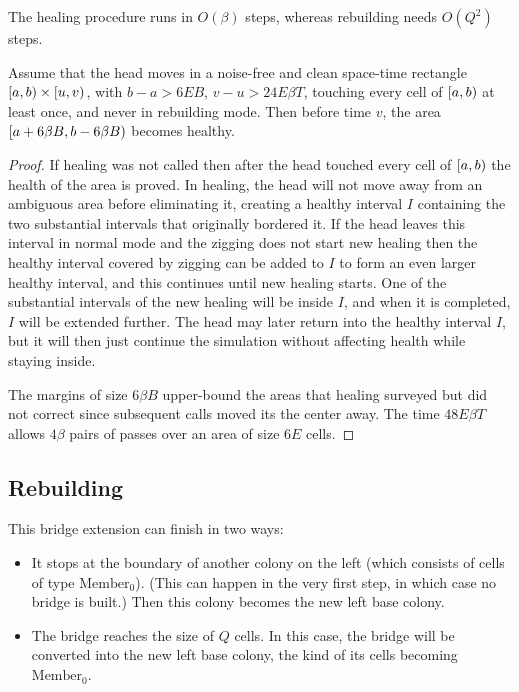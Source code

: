 \documentclass[11pt]{memoir}
\theoremstyle{definition} %
\def\B{B}
\newcommand{\E}{E} %
\newcommand{\Q}{Q} %
\newcommand{\Tu}{T}
\newcommand{\Member}{\mathrm{Member}}
\begin{document}
The healing procedure runs in \( O(\beta) \) 
steps, whereas rebuilding needs \( O(\Q^{2}) \) steps.

\begin{lemma}\label{lem:combined-heals}
  Assume that the head moves in a noise-free and clean space-time rectangle
  \( \left[a,b\right)\times \left[u,v\right) \), with \( b-a>6\E\B \), \( v-u>24\E\beta\Tu \),
touching every cell of \( \left[a,b\right) \) at least once, and never in rebuilding mode.
Then before time \( v \), the area \( \lint{a+6\beta\B}{b-6\beta\B} \) becomes healthy.
\end{lemma}
\begin{proof}
  If healing was not called then after the head touched every cell of \( \left[a,b\right) \) the
  health of the area is proved.
  In healing, the head will not move away from an ambiguous area before eliminating it,
  creating a healthy interval
  \( I \) containing the two substantial intervals that originally bordered it.
  If the head leaves this interval in normal mode and the zigging does not start new healing then the
  healthy interval covered by zigging can be added to \( I \) to form an even larger healthy interval,
  and this continues until new healing starts.
  One of the substantial intervals of the new healing will be inside \( I \), and when it is completed,
  \( I \) will be extended further.
  The head may later return into the healthy interval \( I \),
  but it will then just continue the simulation without
  affecting health while staying inside.

  The margins of size \( 6\beta\B \) upper-bound the areas that healing surveyed but did not
  correct since subsequent calls moved its the center away.
  The time \( 48\E\beta\Tu \) allows \( 4\beta \) pairs of passes over an area of size \( 6\E \) cells.
\end{proof}

\subsection{Rebuilding}\label{sec:rebuilding}




This bridge extension can finish in two ways:
\begin{itemize}
\item It stops at the boundary of another colony on the left
  (which consists of cells of type \( \Member_{0} \)).
  (This can happen in the very first step, in which case no bridge is built.)
  Then this colony becomes the new left base colony.
  
\item The bridge reaches the size of \( \Q \) cells.
  In this case, the bridge will be converted into the new left base colony, the kind of its cells
  becoming \( \Member_{0} \).
\end{itemize}
\end{document}
